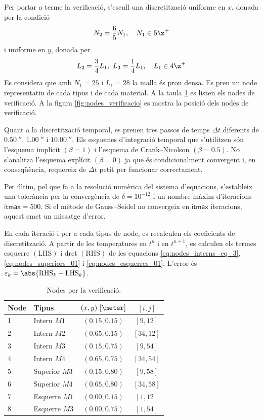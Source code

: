 Per portar a terme la verificació, s'escull una discretització uniforme en $x$, donada per la condició
\begin{equation}
	N_2 = \frac{6}{5} N_1, \quad N_1 \in 5 \z^+
\end{equation}
i uniforme en $y$, donada per
\begin{equation}
	L_2 = \frac{3}{4} L_1, \ 
	L_3 = \frac{1}{4} L_1, \quad
	L_1 \in 4 \z^+
\end{equation}
Es considera que amb $N_1 = 25$ i $L_1 = 28$ la malla és prou densa. Es pren un node representatiu de cada tipus i de cada material. A la taula \ref{tab:nodes_verificacio} es listen els nodes de verificació. A la figura \ref{fig:nodes_verificacio} es mostra la posició dels nodes de verificació.

Quant a la discretització temporal, es prenen tres passos de temps $\Delta t$ diferents de $0.50 \ \second$, $1.00 \ \second$ i $10.00 \ \second$. Els esquemes d'integració temporal que s'utilitzen són l'esquema implícit $\left( \beta = 1 \right)$ i l'esquema de Crank--Nicolson $\left( \beta = 0.5 \right)$. No s'analitza l'esquema explícit $\left( \beta = 0 \right)$ ja que és condicionalment convergent i, en conseqüència, requereix de $\Delta t$ petit per funcionar correctament.

Per últim, pel que fa a la resolució numèrica del sistema d'equacions, s'estableix una tolerància per la convergència de $\delta = 10^{-12}$ i un nombre màxim d'iteracions $\textsf{itmax} = 500$. Si el mètode de Gauss--Seidel no convergeix en $\textsf{itmax}$ iteracions, aquest emet un missatge d'error.

En cada iteració i per a cada tipus de node, es recalculen els coeficients de discretització. A partir de les temperatures en $t^n$ i en $t^{n+1}$, es calculen els termes esquerre $\left( \mathrm{LHS} \right)$ i dret $\left( \mathrm{RHS} \right)$ de les equacions 
\eqref{eq:nodes_interns_eq_3}, \eqref{eq:nodes_superiors_01} i \eqref{eq:nodes_esquerres_01}. L'error és $\varepsilon_k = \abs{\mathrm{RHS}_k - \mathrm{LHS}_k}$.

\begin{table}[ht]
	\centering
	\begin{tabular}{llcc}
		\toprule[0.5mm]
		Node & Tipus & $(x,y) \ [\meter]$ & $[i,j]$ \\
		\midrule[0.25mm]
		1 & Intern $M1$ 	& $(0.15, 0.15)$ & $[9,12]$ \\
		2 & Intern $M2$ 	& $(0.65, 0.15)$ & $[34,12]$ \\
		3 & Intern $M3$ 	& $(0.15, 0.75)$ & $[9,54]$ \\
		4 & Intern $M4$ 	& $(0.65, 0.75)$ & $[34,54]$ \\
		5 & Superior $M3$ 	& $(0.15, 0.80)$ & $[9,58]$ \\
		6 & Superior $M4$ 	& $(0.65, 0.80)$ & $[34,58]$ \\
		7 & Esquerre $M1$ 	& $(0.00, 0.15)$ & $[1,12]$ \\
		8 & Esquerre $M3$ 	& $(0.00, 0.75)$ & $[1,54]$ \\
		\bottomrule[0.5mm]
	\end{tabular}
	\caption{Nodes per la verificació.}
	\label{tab:nodes_verificacio}
\end{table}

